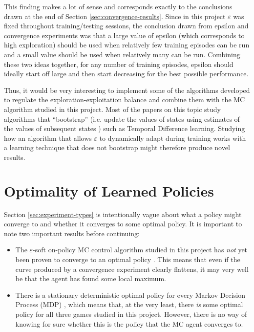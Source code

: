 \documentclass[11pt,a4paper]{report}
\begin{document}
This finding makes a lot of sense and corresponds exactly to the conclusions drawn at the end of Section \ref{sec:convergence-results}. Since in this project $\varepsilon$ was fixed throughout training/testing sessions, the conclusion drawn from epsilon and convergence experiments was that a large value of epsilon (which corresponds to high exploration) should be used when relatively few training episodes can be run and a small value should be used when relatively many can be run. Combining these two ideas together, for any number of training episodes, epsilon should ideally start off large and then start decreasing for the best possible performance.

Thus, it would be very interesting to implement some of the algorithms developed to regulate the exploration-exploitation balance and combine them with the MC algorithm studied in this project. Most of the papers on this topic study algorithms that ``bootstrap'' (i.e. update the values of states using estimates of the values of subsequent states \cite{rl-book}) such as Temporal Difference learning. Studying how an algorithm that allows $\varepsilon$ to dynamically adapt during training works with a learning technique that does not bootstrap might therefore produce novel results.


\section{Optimality of Learned Policies}
\label{sec:policy-optimality}

Section \ref{sec:experiment-types} is intentionally vague about what a policy might converge to and whether it converges to some optimal policy. It is important to note two important results before continuing:

\begin{itemize}
    \item The $\varepsilon$-soft on-policy MC control algorithm studied in this project has \emph{not} yet been proven to converge to an optimal policy \cite{open-rl-questions}. This means that even if the curve produced by a convergence experiment clearly flattens, it may very well be that the agent has found some local maximum.
    \item There is a stationary deterministic optimal policy for every Markov Decision Process (MDP) \cite{mdp-convergence}, which means that, at the very least, there \emph{is} some optimal policy for all three games studied in this project. However, there is no way of knowing for sure whether this is the policy that the MC agent converges to.
\end{itemize}
\end{document}
